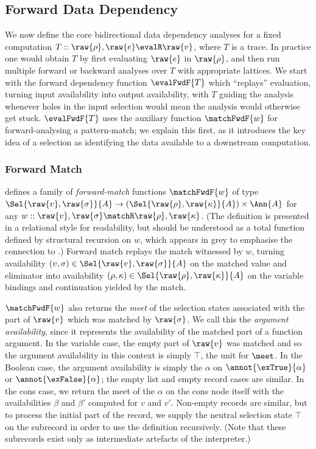 \subsection{Forward Data Dependency}
\label{sec:data-dependencies:analyses:fwd}

We now define the core bidirectional data dependency analyses for a fixed computation $T :: \raw{\rho}, \raw{e} \evalR \raw{v}$, where $T$ is a trace. In practice one would obtain $T$ by first evaluating $\raw{e}$ in $\raw{\rho}$, and then run multiple forward or backward analyses over $T$ with appropriate lattices. We start with the forward dependency function $\evalFwdF{T}$ which ``replays'' evaluation, turning input availability into output availability, with $T$ guiding the analysis whenever holes in the input selection would mean the analysis would otherwise get stuck. $\evalFwdF{T}$ uses the auxiliary function $\matchFwdF{w}$ for forward-analysing a pattern-match; we explain this first, as it introduces the key idea of a selection as identifying the data available to a downstream computation.

\subsubsection{Forward Match}
\label{sec:data-dependencies:analyses:fwd:pattern-match}

 defines a family of \emph{forward-match} functions $\matchFwdF{w}$ of type $\Sel{\raw{v}, \raw{\sigma}}{A} \to (\Sel{\raw{\rho}, \raw{\kappa}}{A}) \times \Ann{A}$ for any $w :: \raw{v}, \raw{\sigma} \matchR \raw{\rho}, \raw{\kappa}$. (The definition is presented in a relational style for readability, but should be understood as a total function defined by structural recursion on $w$, which appears in grey to emphasise the connection to .) Forward match replays the match witnessed by $w$, turning availability $(v,\sigma) \in \Sel{\raw{v},\raw{\sigma}}{A}$ on the matched value and eliminator into availability $(\rho,\kappa) \in \Sel{\raw{\rho},{\raw{\kappa}}}{A}$ on the variable bindings and continuation yielded by the match.

$\matchFwdF{w}$ also returns the \emph{meet} of the selection states associated with the part of $\raw{v}$ which was matched by $\raw{\sigma}$. We call this the \emph{argument availability}, since it represents the availability of the matched part of a function argument. In the variable case, the empty part of $\raw{v}$ was matched and so the argument availability in this context is simply $\top$, the unit for $\meet$. In the Boolean case, the argument availability is simply the $\alpha$ on $\annot{\exTrue}{\alpha}$ or $\annot{\exFalse}{\alpha}$; the empty list and empty record cases are similar. In the cons case, we return the meet of the $\alpha$ on the cons node itself with the availabilities $\beta$ and $\beta'$ computed for $v$ and $v'$. Non-empty records are similar, but to process the initial part of the record, we supply the neutral selection state $\top$ on the subrecord in order to use the definition recursively. (Note that these subrecords exist only as intermediate artefacts of the interpreter.)

